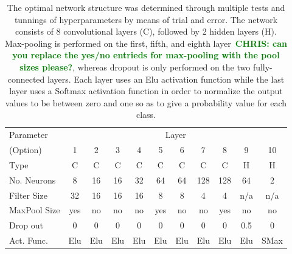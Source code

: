 \documentclass[%
 amsmath,amssymb,
 aps,
 twocolumn,
 prl,
 reprint,
floatfix,
]{revtex4-1}
\newcommand{\chris}[1]{\textbf{\textcolor{green}{CHRIS: #1}}}
\begin{document}
\begin{table}[]
\begin{tabular}{lcccccccccc}
\hline
\hline
Parameter & \multicolumn{10}{c}{Layer}\\
\cline{2-11}
(Option) & 1 & 2 & 3 & 4 & 5 & 6 & 7 & 8 & 9 & 10 \\
\hline
Type & C & C & C & C & C & C & C & C & H & H \\
No. Neurons  & 8  & 16  & 16 & 32 & 64 & 64 & 128 & 128 & 64  & 2  \\
Filter Size  & 32 & 16  & 16 & 16 & 8  & 8  & 4   & 4   & n/a & n/a \\
MaxPool Size & yes & no & no & no & yes & no & no & yes & no & no \\
Drop out  & 0 & 0 & 0 & 0 & 0 & 0 & 0 & 0 & 0.5 & 0 \\
Act. Func. & Elu & Elu & Elu & Elu & Elu & Elu & Elu & Elu & Elu & SMax \\
\hline
\end{tabular}
\caption{The optimal network structure was determined through multiple tests
and tunnings of hyperparameters by means of trial and error. The network
consists of 8 convolutional layers (C), followed by 2 hidden layers (H).
Max-pooling is performed on the first, fifth, and eighth layer~\chris{can you
replace the yes/no entrieds for max-pooling with the pool sizes please?},
whereas dropout is only performed on the two fully-connected layers. Each layer
uses an Elu activation function while the last layer uses a Softmax activation
function in order to normalize the output values to be between zero and one so
as to give a probability value for each class.\label{table:network}}
\end{table}
\end{document}
